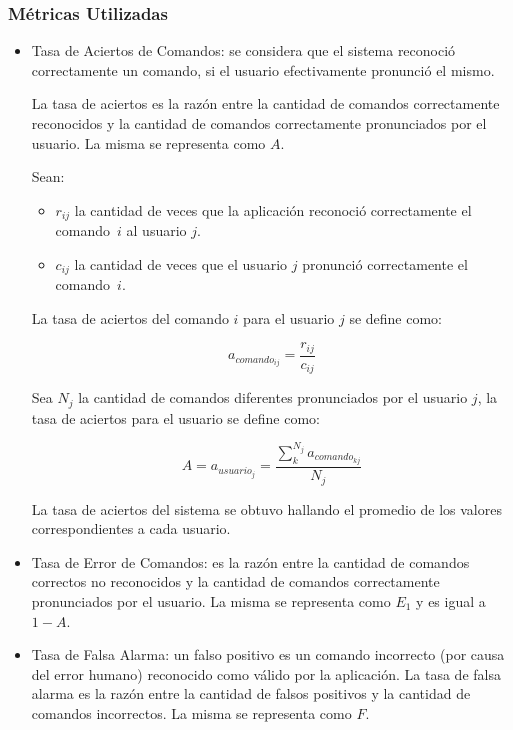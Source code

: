 \subsubsection{M\'etricas Utilizadas}
\begin{itemize}
	\item Tasa de Aciertos de Comandos: se considera que el sistema reconoci\'o correctamente
	un comando, si el usuario efectivamente pronunci\'o el mismo.

	La tasa de aciertos es la raz\'on entre la cantidad de comandos correctamente reconocidos 
	y la cantidad de comandos correctamente pronunciados por el usuario. 
	La misma se representa como $A$.
	
	Sean:

	\begin{itemize}
		\item $r_{ij}$ la cantidad de veces que la aplicaci\'on reconoci\'o correctamente el \mbox{comando $i$}
		al usuario $j$.
		\item $c_{ij}$ la cantidad de veces que el usuario $j$ pronunci\'o correctamente el \mbox{comando $i$.}
	\end{itemize}
	La tasa de aciertos del comando $i$ para el usuario $j$ se define como: 

	\begin{equation*}
		a_{{comando}_{ij}}=\frac{r_{ij}}{c_{ij}}
	\end{equation*}


	Sea $N_{j}$ la cantidad de comandos diferentes pronunciados por el usuario $j$,
	la tasa de aciertos para el usuario  se define como:
	
	\begin{equation*}
		A=a_{{usuario}_j}=\frac{\sum_k^{N_{j}}a_{{comando}_{kj}}}{N_{j}}
	\end{equation*}

	La tasa de aciertos del sistema se obtuvo hallando el promedio de los valores correspondientes
	a cada usuario.

	\item Tasa de Error de Comandos: es la raz\'on entre la cantidad de comandos correctos no reconocidos 
	y la cantidad de comandos correctamente pronunciados por el usuario. 
	La misma se representa como $E_1$ y es igual a $1-A$.


	\item Tasa de Falsa Alarma: un falso positivo es un comando incorrecto (por causa del error humano)
	reconocido como v\'alido por la aplicaci\'on.
	La tasa de falsa alarma es la raz\'on entre la cantidad de falsos positivos y la cantidad
	de comandos incorrectos. La misma se representa como $F$.


\end{itemize}
